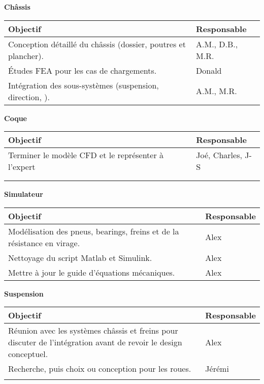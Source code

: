 \textbf{\large Ch\^assis}\\
\begin{tabularx}{\linewidth}{
    |>{\hsize=1.75\hsize}X|%
    >{\hsize=0.25\hsize}X|%
  }
    \hline
    \textbf{Objectif} & \textbf{Responsable} \\\hline
       Conception détaillé du ch\^assis (dossier, poutres et plancher). & A.M., D.B., M.R.\\\hline 
       Études FEA pour les cas de chargements. & Donald\\\hline
       Intégration des sous-systèmes (suspension, direction, ). & A.M., M.R. \\\hline 
\end{tabularx}



\hfill \break
\textbf{\large Coque}\\
\begin{tabularx}{\linewidth}{
    |>{\hsize=1.75\hsize}X|%
    >{\hsize=0.25\hsize}X|%
  }
    \hline
    \textbf{Objectif} & \textbf{Responsable} \\\hline
       Terminer le modèle CFD et le représenter à l'expert & Joé, Charles, J-S \\\hline
       & \\\hline
       & \\\hline 
\end{tabularx}



\hfill \break
\textbf{\large Simulateur}\\
\begin{tabularx}{\linewidth}{
    |>{\hsize=1.75\hsize}X|%
    >{\hsize=0.25\hsize}X|%
  }
    \hline
    \textbf{Objectif} & \textbf{Responsable} \\\hline
       Modélisation des pneus, bearings, freins et de la résistance en virage.&Alex \\\hline 
       Nettoyage du script Matlab et Simulink.&Alex \\\hline
       Mettre à jour le guide d'équations mécaniques.&Alex \\\hline 
\end{tabularx}



\hfill \break
\textbf{\large Suspension}\\
\begin{tabularx}{\linewidth}{
    |>{\hsize=1.75\hsize}X|%
    >{\hsize=0.25\hsize}X|%
  }
    \hline
    \textbf{Objectif} & \textbf{Responsable} \\\hline
       Réunion avec les systèmes châssis et freins pour discuter de l'intégration avant de revoir le design conceptuel.&Alex \\\hline 
       Recherche, puis choix ou conception pour les roues. & Jérémi\\\hline
       & \\\hline 
\end{tabularx}




